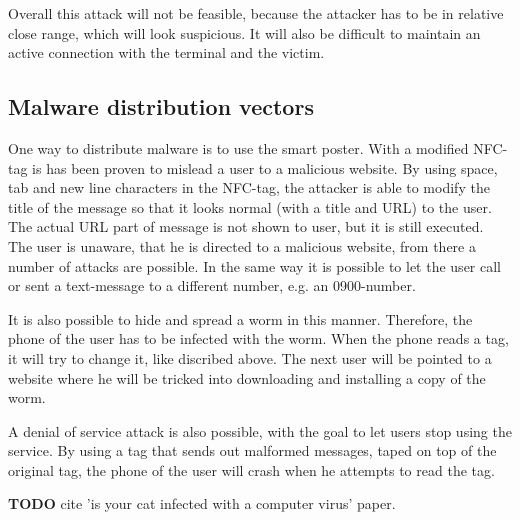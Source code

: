 Overall this attack will not be feasible, because the attacker has to be in relative close range, which will look suspicious. It will also be difficult to maintain an active connection with the terminal and the victim.




\subsection{Malware distribution vectors}
One way to distribute malware is to use the smart poster. With a modified NFC-tag is has been proven to mislead a user to a malicious website. By using space, tab and new line characters in the NFC-tag, the attacker is able to modify the title of the message so that it looks normal (with a title and URL) to the user. The actual URL part of message is not shown to user, but it is still executed. The user is unaware, that he is directed to a malicious website, from there a number of attacks are possible. In the same way it is possible to let the user call or sent a text-message to a different number, e.g. an 0900-number.

It is also possible to hide and spread a worm in this manner. Therefore, the phone of the user has to be infected with the worm. When the phone reads a tag, it will try to change it, like discribed above. The next user will be pointed to a website where he will be tricked into downloading and installing a copy of the worm.

A denial of service attack is also possible, with the goal to let users stop using the service. By using a tag that sends out malformed messages, taped on top of the original tag, the phone of the user will crash when he attempts to read the tag. \cite{10.1109/ARES.2009.46} 

\textbf{TODO} cite 'is your cat infected with a computer virus' paper.


